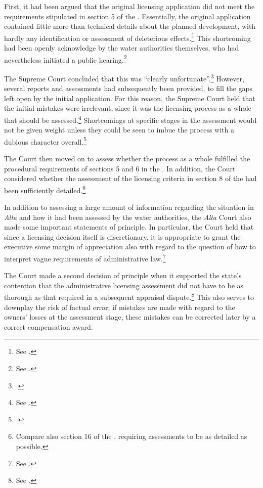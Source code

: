 First, it had been argued that the original licensing application did not meet the requirements stipulated in section 5 of the \cite{wra17}. Essentially, the original application contained little more than technical details about the planned development, with hardly any identification or assessment of deleterious effects.\footnote{See \cite[264-265]{alta82}.} This shortcoming had been openly acknowledge by the water authorities themselves, who had nevertheless initiated a public hearing.\footnote{See \cite[265]{alta82}.}

The Supreme Court concluded that this was ``clearly unfortunate''.\footcite[265]{alta82} However, several reports and assessments had subsequently been provided, to fill the gaps left open by the initial application. For this reason, the Supreme Court held that the initial mistakes were irrelevant, since it was the licensing process as a whole that should be assessed.\footnote{See \cite[265-266]{alta82}.} Shortcomings at specific stages in the assessment would not be given weight unless they could be seen to imbue the process with a dubious character overall.\footcite[265]{alta82}

The Court then moved on to assess whether the process as a whole fulfilled the procedural requirements of sections 5 and 6 in the \cite{wra17}. In addition, the Court considered whether the assessment of the licensing criteria in section 8 of the \cite{wra17} had been sufficiently detailed.\footnote{Compare also section 16 of the \cite{paa67}, requiring assessments to be as detailed as possible.}

In addition to assessing a large amount of information regarding the situation in {\it Alta} and how it had been assessed by the water authorities, the {\it Alta} Court also made some important statements of principle. In particular, the Court held that since a licensing decision itself is discretionary, it is appropriate to grant the executive some margin of appreciation also with regard to the question of how to interpret vague requirements of administrative law.\footnote{See \cite[262-264]{alta82}.}

The Court made a second decision of principle when it supported the state's contention that the administrative licensing assessment did not have to be as thorough as that required in a subsequent appraisal dispute.\footnote{See \cite[279|330]{alta82}.} This also serves to downplay the risk of factual error; if mistakes are made with regard to the owners' losses at the assessment stage, these mistakes can be corrected later by a correct compensation award.

